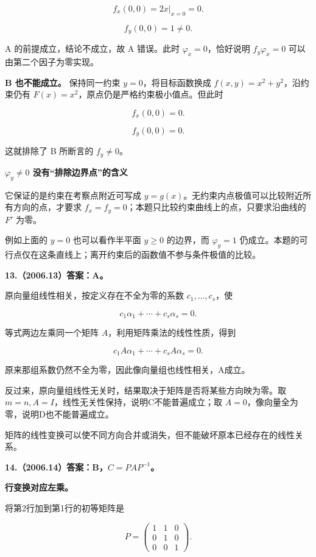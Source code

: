 \documentclass[UTF8,11pt,fontset=windows]{ctexart}
\begin{document}
$$
f_x(0,0)=\left.2x\right|_{x=0}=0.
$$

$$
f_y(0,0)=1\ne0.
$$

A 的前提成立，结论不成立，故 A 错误。此时 $\varphi_x=0$，恰好说明 $f_y\varphi_x=0$ 可以由第二个因子为零实现。

\textbf{B 也不能成立。} 保持同一约束 $y=0$，将目标函数换成 $f(x,y)=x^2+y^2$，沿约束仍有 $F(x)=x^2$，原点仍是严格约束极小值点。但此时

$$
f_x(0,0)=0.
$$

$$
f_y(0,0)=0.
$$

这就排除了 B 所断言的 $f_y\ne0$。

{\bfseries $\varphi_y\ne0$ 没有“排除边界点”的含义\par}
它保证的是约束在考察点附近可写成 $y=g(x)$。无约束内点极值可以比较附近所有方向的点，才要求 $f_x=f_y=0$；本题只比较约束曲线上的点，只要求沿曲线的 $F'$ 为零。

例如上面的 $y=0$ 也可以看作半平面 $y\ge0$ 的边界，而 $\varphi_y=1$ 仍成立。本题的可行点仅在这条直线上；离开约束后的函数值不参与条件极值的比较。

\clearpage

\textbf{13.（2006.13）答案：A。}

原向量组线性相关，按定义存在不全为零的系数 $c_1,\ldots,c_s$，使

$$
c_1\alpha_1+\cdots+c_s\alpha_s=0.
$$

等式两边左乘同一个矩阵 $A$，利用矩阵乘法的线性性质，得到

$$
c_1A\alpha_1+\cdots+c_sA\alpha_s=0.
$$

原来那组系数仍然不全为零，因此像向量组也线性相关，A成立。

反过来，原向量组线性无关时，结果取决于矩阵是否将某些方向映为零。取 $m=n,A=I$，线性无关性保持，说明C不能普遍成立；取 $A=0$，像向量全为零，说明D也不能普遍成立。

矩阵的线性变换可以使不同方向合并或消失，但不能破坏原本已经存在的线性关系。

\clearpage

\textbf{14.（2006.14）答案：B，$C=PAP^{-1}$。}

\textbf{行变换对应左乘。}

将第2行加到第1行的初等矩阵是

$$
P=\begin{pmatrix}1&1&0\\0&1&0\\0&0&1\end{pmatrix}.
$$
\end{document}
